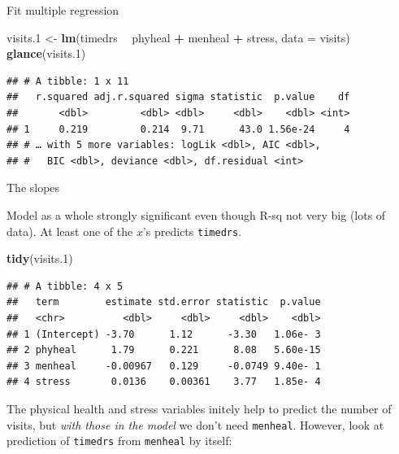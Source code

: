 \documentclass[ignorenonframetext,]{beamer}
\newenvironment{Shaded}{\begin{snugshade}}{\end{snugshade}}
\newcommand{\DataTypeTok}[1]{\textcolor[rgb]{0.13,0.29,0.53}{#1}}
\newcommand{\FloatTok}[1]{\textcolor[rgb]{0.00,0.00,0.81}{#1}}
\newcommand{\KeywordTok}[1]{\textcolor[rgb]{0.13,0.29,0.53}{\textbf{#1}}}
\newcommand{\NormalTok}[1]{#1}
\newcommand{\OperatorTok}[1]{\textcolor[rgb]{0.81,0.36,0.00}{\textbf{#1}}}
\newcommand{\StringTok}[1]{\textcolor[rgb]{0.31,0.60,0.02}{#1}}
\begin{document}
\begin{frame}[fragile]{Fit multiple regression}
\protect\hypertarget{fit-multiple-regression}{}

\begin{Shaded}
\begin{Highlighting}[]
\NormalTok{visits}\FloatTok{.1}\NormalTok{ <-}\StringTok{ }\KeywordTok{lm}\NormalTok{(timedrs }\OperatorTok{~}\StringTok{ }\NormalTok{phyheal }\OperatorTok{+}\StringTok{ }\NormalTok{menheal }\OperatorTok{+}\StringTok{ }\NormalTok{stress,}
  \DataTypeTok{data =}\NormalTok{ visits)}
\KeywordTok{glance}\NormalTok{(visits}\FloatTok{.1}\NormalTok{)}
\end{Highlighting}
\end{Shaded}

\begin{verbatim}
## # A tibble: 1 x 11
##   r.squared adj.r.squared sigma statistic  p.value    df
##       <dbl>         <dbl> <dbl>     <dbl>    <dbl> <int>
## 1     0.219         0.214  9.71      43.0 1.56e-24     4
## # … with 5 more variables: logLik <dbl>, AIC <dbl>,
## #   BIC <dbl>, deviance <dbl>, df.residual <int>
\end{verbatim}

\end{frame}

\begin{frame}[fragile]{The slopes}
\protect\hypertarget{the-slopes}{}

Model as a whole strongly significant even though R-sq not very big
(lots of data). At least one of the \(x\)'s predicts \texttt{timedrs}.

\begin{Shaded}
\begin{Highlighting}[]
\KeywordTok{tidy}\NormalTok{(visits}\FloatTok{.1}\NormalTok{)}
\end{Highlighting}
\end{Shaded}

\begin{verbatim}
## # A tibble: 4 x 5
##   term        estimate std.error statistic  p.value
##   <chr>          <dbl>     <dbl>     <dbl>    <dbl>
## 1 (Intercept) -3.70      1.12      -3.30   1.06e- 3
## 2 phyheal      1.79      0.221      8.08   5.60e-15
## 3 menheal     -0.00967   0.129     -0.0749 9.40e- 1
## 4 stress       0.0136    0.00361    3.77   1.85e- 4
\end{verbatim}

The physical health and stress variables initely help to predict the
number of visits, but \emph{with those in the model} we don't need
\texttt{menheal}. However, look at prediction of \texttt{timedrs} from
\texttt{menheal} by itself:

\end{frame}
\end{document}
